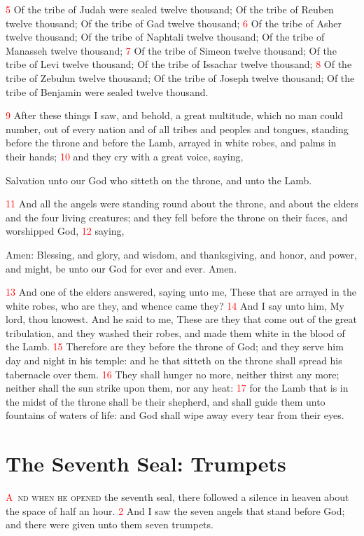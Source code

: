 \documentclass[12pt,twoside]{memoir}
\newcommand{\vnum}[1]{\textcolor{red}{\normalsize{#1}}}
\begin{document}
\vnum{5} 
Of the tribe of Judah were sealed twelve thousand;
Of the tribe of Reuben twelve thousand;
Of the tribe of Gad twelve thousand;
\vnum{6} 
Of the tribe of Asher twelve thousand;
Of the tribe of Naphtali twelve thousand;
Of the tribe of Manasseh twelve thousand;
\vnum{7} 
Of the tribe of Simeon twelve thousand;
Of the tribe of Levi twelve thousand;
Of the tribe of Issachar twelve thousand;
\vnum{8} 
Of the tribe of Zebulun twelve thousand;
Of the tribe of Joseph twelve thousand;
Of the tribe of Benjamin were sealed twelve thousand.

\vnum{9} After these things I saw, and behold, a great multitude, which no man could number, out of every nation and of all tribes and peoples and tongues, standing before the throne and before the Lamb, arrayed in white robes, and palms in their hands; %
\vnum{10} and they cry with a great voice, saying,

Salvation unto our God who sitteth on the throne, and unto the Lamb.

\vnum{11} And all the angels were standing round about the throne, and about the elders and the four living creatures; and they fell before the throne on their faces, and worshipped God, %
\vnum{12} saying,

Amen: Blessing, and glory, and wisdom, and thanksgiving, and honor, and power, and might, be unto our God for ever and ever. Amen.

\vnum{13} And one of the elders answered, saying unto me, These that are arrayed in the white robes, who are they, and whence came they? %
\vnum{14} And I say unto him, My lord, thou knowest. And he said to me, These are they that come out of the great tribulation, and they washed their robes, and made them white in the blood of the Lamb. %
\vnum{15} Therefore are they before the throne of God; and they serve him day and night in his temple: and he that sitteth on the throne shall spread his tabernacle over them. %
\vnum{16} They shall hunger no more, neither thirst any more; neither shall the sun strike upon them, nor any heat: %
\vnum{17} for the Lamb that is in the midst of the throne shall be their shepherd, and shall guide them unto fountains of waters of life: and God shall wipe away every tear from their eyes.


\chapter{The Seventh Seal: Trumpets}
\lettrine[lines=3]{\textcolor{red}{A}}{\ nd when he opened} the seventh seal, there followed a silence in heaven about the space of half an hour. %
\vnum{2} And I saw the seven angels that stand before God; and there were given unto them seven trumpets.
\end{document}
